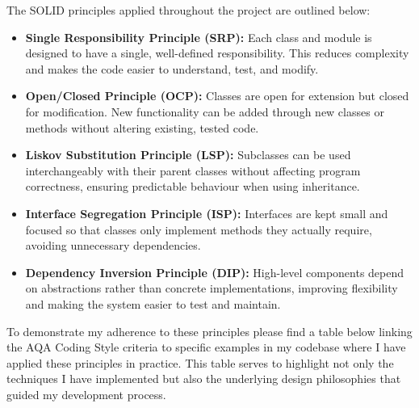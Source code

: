 The SOLID principles applied throughout the project are outlined below:
\begin{itemize}
    \item \textbf{Single Responsibility Principle (SRP):} Each class and module is designed to have a single, well-defined responsibility. This reduces complexity and makes the code easier to understand, test, and modify.
    \item \textbf{Open/Closed Principle (OCP):} Classes are open for extension but closed for modification. New functionality can be added through new classes or methods without altering existing, tested code.
    \item \textbf{Liskov Substitution Principle (LSP):} Subclasses can be used interchangeably with their parent classes without affecting program correctness, ensuring predictable behaviour when using inheritance.
    \item \textbf{Interface Segregation Principle (ISP):} Interfaces are kept small and focused so that classes only implement methods they actually require, avoiding unnecessary dependencies.
    \item \textbf{Dependency Inversion Principle (DIP):} High-level components depend on abstractions rather than concrete implementations, improving flexibility and making the system easier to test and maintain.
\end{itemize}

To demonstrate my adherence to these principles please find a table below linking the AQA Coding Style criteria to specific examples in my codebase where I have applied these principles in practice. This table serves to highlight not only the techniques I have implemented but also the underlying design philosophies that guided my development process.


